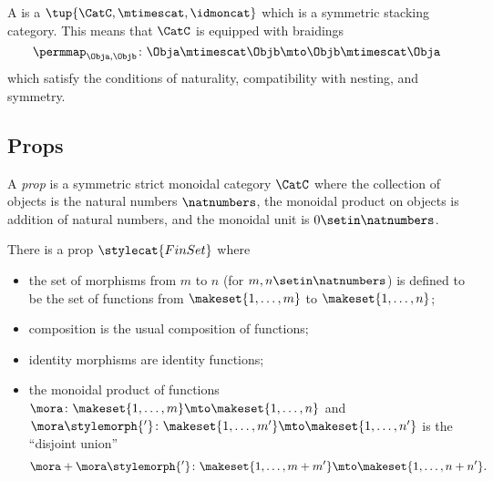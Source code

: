 
\begin{ctdefinition}
    \label{def:symmetric-strict-monoidal-cat}
    A  is a  $\tup{\CatC, \mtimescat, \idmoncat}$ which is a symmetric stacking category.
    This means that $\CatC$ is equipped with braidings
    \begin{equation}
        \permmap_{\Obja, \Objb} \colon \Obja \mtimescat \Objb \mto \Objb \mtimescat \Obja \end{equation}
    which satisfy the conditions of naturality, compatibility with nesting, and symmetry.
\end{ctdefinition}

\subsection{Props}

\begin{ctdefinition}\label{def:prop}
    A \emph{prop} is a symmetric strict monoidal category $\CatC$ where the collection of objects is the natural numbers $\natnumbers$, the monoidal product on objects is addition of natural numbers, and the monoidal unit is $0 \setin \natnumbers$.
\end{ctdefinition}

\begin{example}\label{exa:prop-finset}
    There is a prop $\stylecat{FinSet}$ where
    \begin{itemize}
        \item the set of morphisms from $m$ to $n$ (for $m, n \setin \natnumbers$) is defined to be the set of functions from $\makeset{1, \dots, m}$ to $\makeset{1, \dots, n}$;
        \item composition is the usual composition of functions;
        \item identity morphisms are identity functions;
        \item the monoidal product of functions $\mora \colon \makeset{1, \dots, m} \mto \makeset{1, \dots, n}$ and $\mora\stylemorph{'} \colon \makeset{1, \dots, m'} \mto \makeset{1, \dots, n'}$ is the ``disjoint union''
              \begin{equation}
                  \mora + \mora\stylemorph{'} \colon \makeset{1, \dots, m + m'} \mto \makeset{1, \dots, n + n'}.
              \end{equation}
    \end{itemize}
\end{example}

